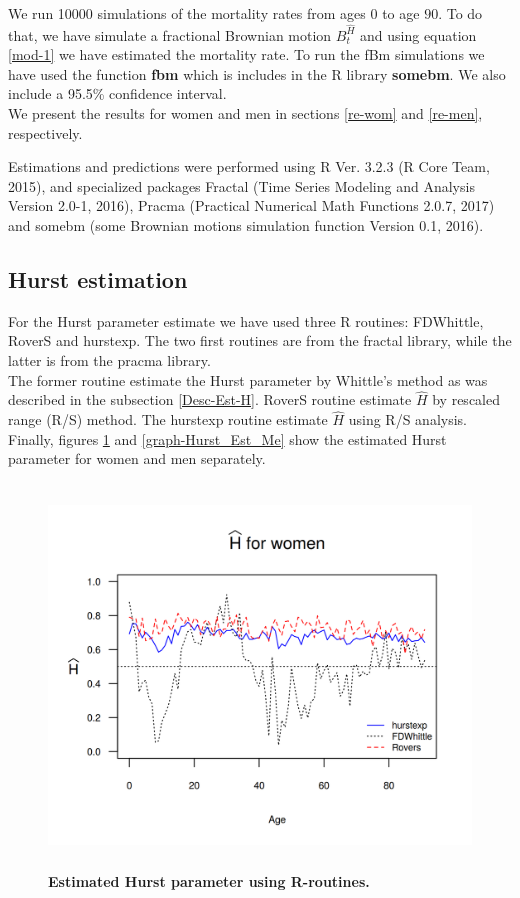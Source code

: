 \documentclass[12pt,reqno]{amsart}
\theoremstyle{definition}
\theoremstyle{remark}
\numberwithin{equation}{section}
\begin{document}
We run 10000 simulations of the mortality rates from ages $0$ to age $90$. To do that, we have simulate a fractional Brownian motion $B_t^{\hat H}$ and using equation \eqref{mod-1} we have estimated the mortality rate. To run the fBm simulations we have used the function {\bf fbm} which is includes in the R library {\bf somebm}.  We also include a  95.5\% confidence interval.\\


We present the results for women and men in sections \ref{re-wom} and \ref{re-men}, respectively.

Estimations and predictions were performed using R Ver. 3.2.3 (R Core Team, 2015), and specialized packages
Fractal (Time Series Modeling and Analysis
Version 2.0-1, 2016), Pracma (Practical Numerical Math Functions 2.0.7, 2017) and somebm (some Brownian motions simulation function Version 0.1, 2016).


\subsection{Hurst estimation}\label{hu-est}

For the Hurst parameter estimate we have used three R routines: FDWhittle, RoverS and hurstexp.
The two first routines are from the fractal library, while the latter is from the pracma library.\\

The former routine estimate the Hurst parameter by Whittle's method as was described in the subsection \ref{Desc-Est-H}. RoverS routine
estimate $\hat H $ by rescaled range (R/S) method. The hurstexp routine estimate $\hat H $  using
R/S analysis. \\

Finally, figures \ref{graph-Hurst_Est_Wo} and \ref{graph-Hurst_Est_Me} show
 the estimated Hurst parameter for women and men separately.

\begin{figure}[H]
\includegraphics[width = 4.5in,  height=4in]{Hurst-Women.png}
\caption{\bf Estimated Hurst parameter using R-routines.}
\label{graph-Hurst_Est_Wo}
\end{figure}\vspace*{0.1cm}
\end{document}

